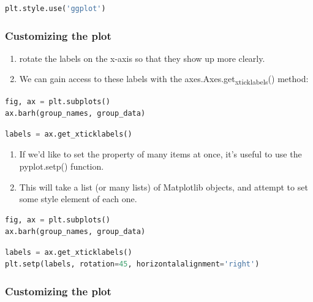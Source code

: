 \documentclass[UTF8,a4paper,12pt]{ctexart}  %
\providecommand{\tightlist}{\setlength{\itemsep}{0pt}\setlength{\parskip}{0pt}}
\begin{document}
\begin{lstlisting}[language=Python]
plt.style.use('ggplot')
\end{lstlisting}

\hypertarget{customizing-the-plot}{%
\subsubsection{Customizing the plot}\label{customizing-the-plot}}

\begin{enumerate}
\def\labelenumi{\arabic{enumi}.}
\tightlist
\item
  rotate the labels on the x-axis so that they show up more clearly.
\item
  We can gain access to these labels with the
  axes.Axes.get\textsubscript{xticklabels}() method:
\end{enumerate}

\begin{lstlisting}[language=Python]
fig, ax = plt.subplots()
ax.barh(group_names, group_data)
\end{lstlisting}

\begin{lstlisting}[language=Python]
labels = ax.get_xticklabels()
\end{lstlisting}

\begin{enumerate}
\def\labelenumi{\arabic{enumi}.}
\tightlist
\item
  If we'd like to set the property of many items at once, it's
  useful to use the pyplot.setp() function.
\item
  This will take a list (or many lists) of Matplotlib objects, and
  attempt to set some style element of each one.
\end{enumerate}

\begin{lstlisting}[language=Python]
fig, ax = plt.subplots()
ax.barh(group_names, group_data)
\end{lstlisting}

\begin{lstlisting}[language=Python]
labels = ax.get_xticklabels()
plt.setp(labels, rotation=45, horizontalalignment='right')
\end{lstlisting}

\hypertarget{customizing-the-plot-1}{%
\subsubsection{Customizing the plot}\label{customizing-the-plot-1}}
\end{document}
